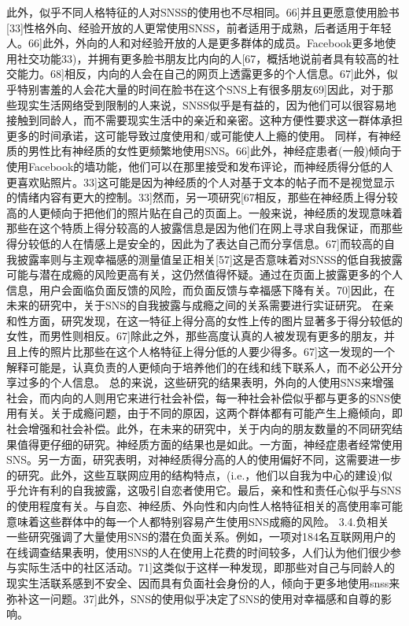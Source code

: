 此外，似乎不同人格特征的人对SNSS的使用也不尽相同。66]并且更愿意使用脸书[33]性格外向、经验开放的人更常使用SNSS，前者适用于成熟，后者适用于年轻人。66]此外，外向的人和对经验开放的人是更多群体的成员。Facebook更多地使用社交功能33)，并拥有更多脸书朋友比内向的人[67，概括地说前者具有较高的社交能力。68]相反，内向的人会在自己的网页上透露更多的个人信息。67]此外，似乎特别害羞的人会花大量的时间在脸书在这个SNS上有很多朋友69]因此，对于那些现实生活网络受到限制的人来说，SNSS似乎是有益的，因为他们可以很容易地接触到同龄人，而不需要现实生活中的亲近和亲密。这种方便性要求这一群体承担更多的时间承诺，这可能导致过度使用和/或可能使人上瘾的使用。
同样，有神经质的男性比有神经质的女性更频繁地使用SNS。66]此外，神经症患者(一般)倾向于使用Facebook的墙功能，他们可以在那里接受和发布评论，而神经质得分低的人更喜欢贴照片。33]这可能是因为神经质的个人对基于文本的帖子而不是视觉显示的情绪内容有更大的控制。33]然而，另一项研究[67相反，那些在神经质上得分较高的人更倾向于把他们的照片贴在自己的页面上。一般来说，神经质的发现意味着那些在这个特质上得分较高的人披露信息是因为他们在网上寻求自我保证，而那些得分较低的人在情感上是安全的，因此为了表达自己而分享信息。67]而较高的自我披露率则与主观幸福感的测量值呈正相关[57]这是否意味着对SNSS的低自我披露可能与潜在成瘾的风险更高有关，这仍然值得怀疑。通过在页面上披露更多的个人信息，用户会面临负面反馈的风险，而负面反馈与幸福感下降有关。70]因此，在未来的研究中，关于SNS的自我披露与成瘾之间的关系需要进行实证研究。
在亲和性方面，研究发现，在这一特征上得分高的女性上传的图片显著多于得分较低的女性，而男性则相反。67]除此之外，那些高度认真的人被发现有更多的朋友，并且上传的照片比那些在这个人格特征上得分低的人要少得多。67]这一发现的一个解释可能是，认真负责的人更倾向于培养他们的在线和线下联系人，而不必公开分享过多的个人信息。
总的来说，这些研究的结果表明，外向的人使用SNS来增强社会，而内向的人则用它来进行社会补偿，每一种社会补偿似乎都与更多的SNS使用有关。关于成瘾问题，由于不同的原因，这两个群体都有可能产生上瘾倾向，即社会增强和社会补偿。此外，在未来的研究中，关于内向的朋友数量的不同研究结果值得更仔细的研究。神经质方面的结果也是如此。一方面，神经症患者经常使用SNS。另一方面，研究表明，对神经质得分高的人的使用偏好不同，这需要进一步的研究。此外，这些互联网应用的结构特点，(i.e.，他们以自我为中心的建设)似乎允许有利的自我披露，这吸引自恋者使用它。最后，亲和性和责任心似乎与SNS的使用程度有关。与自恋、神经质、外向性和内向性人格特征相关的高使用率可能意味着这些群体中的每一个人都特别容易产生使用SNS成瘾的风险。
3.4.负相关
一些研究强调了大量使用SNS的潜在负面关系。例如，一项对184名互联网用户的在线调查结果表明，使用SNS的人在使用上花费的时间较多，人们认为他们很少参与实际生活中的社区活动。71]这类似于这样一种发现，即那些对自己与同龄人的现实生活联系感到不安全、因而具有负面社会身份的人，倾向于更多地使用snss来弥补这一问题。37]此外，SNS的使用似乎决定了SNS的使用对幸福感和自尊的影响。
